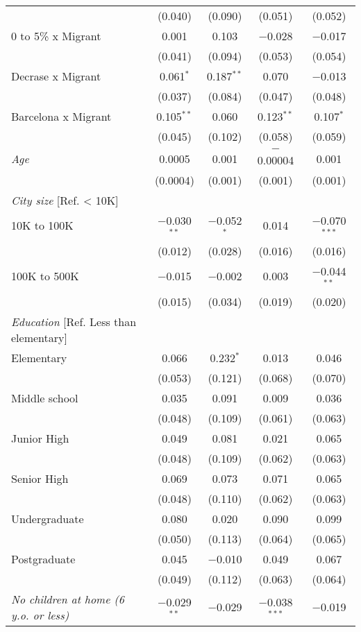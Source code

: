 \documentclass[12pt,a4paper]{article}
\begin{document}
\begin{scriptsize}
\begin{longtable}{lcccc}
   & (0.040) & (0.090) & (0.051) & (0.052) \\ 
0 to 5\% x Migrant  & 0.001 & 0.103 & $-$0.028 & $-$0.017 \\ 
  & (0.041) & (0.094) & (0.053) & (0.054) \\ 
Decrase x Migrant  & 0.061$^{*}$ & 0.187$^{**}$ & 0.070 & $-$0.013 \\ 
   & (0.037) & (0.084) & (0.047) & (0.048) \\ 
Barcelona x Migrant  & 0.105$^{**}$ & 0.060 & 0.123$^{**}$ & 0.107$^{*}$ \\ 
   & (0.045) & (0.102) & (0.058) & (0.059) \\
{\it Age}   & 0.0005 & 0.001 & $-$0.00004 & 0.001 \\ 
    & (0.0004) & (0.001) & (0.001) & (0.001) \\ 
{\it City size} [Ref. < 10K]\\
10K to 100K   & $-$0.030$^{**}$ & $-$0.052$^{*}$ & 0.014 & $-$0.070$^{***}$ \\ 
    & (0.012) & (0.028) & (0.016) & (0.016) \\ 
100K to 500K   & $-$0.015 & $-$0.002 & 0.003 & $-$0.044$^{**}$ \\ 
    & (0.015) & (0.034) & (0.019) & (0.020) \\ 
  {\it Education} [Ref. Less than elementary]  &  &  &  &  \\ 
   Elementary &   0.066 & 0.232$^{*}$ & 0.013 & 0.046 \\ 
     & (0.053) & (0.121) & (0.068) & (0.070) \\ 
   Middle school   & 0.035 & 0.091 & 0.009 & 0.036 \\ 
     & (0.048) & (0.109) & (0.061) & (0.063) \\ 
   Junior High &  0.049 & 0.081 & 0.021 & 0.065 \\ 
     & (0.048) & (0.109) & (0.062) & (0.063) \\ 
   Senior High &  0.069 & 0.073 & 0.071 & 0.065 \\ 
     & (0.048) & (0.110) & (0.062) & (0.063) \\ 
   Undergraduate & 0.080 & 0.020 & 0.090 & 0.099 \\ 
     & (0.050) & (0.113) & (0.064) & (0.065) \\ 
   Postgraduate & 0.045 & $-$0.010 & 0.049 & 0.067 \\ 
     & (0.049) & (0.112) & (0.063) & (0.064) \\ 
{\it No children at home (6 y.o. or less)}   & $-$0.029$^{**}$ & $-$0.029 & $-$0.038$^{***}$ & $-$0.019 \\ 

\end{longtable}
\end{scriptsize}
\end{document}
